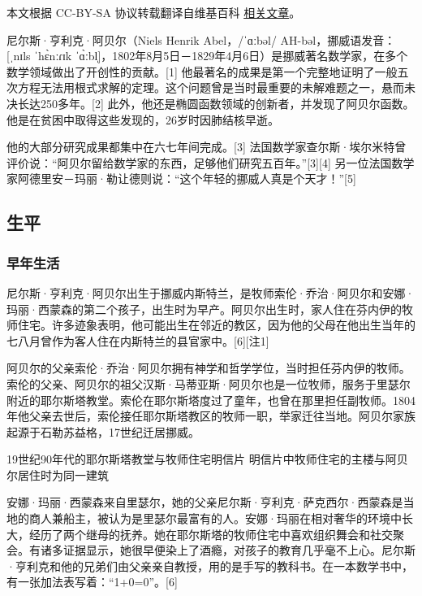 
本文根据 CC-BY-SA 协议转载翻译自维基百科 \href{https://en.wikipedia.org/wiki/Niels_Henrik_Abel}{相关文章}。

尼尔斯·亨利克·阿贝尔（Niels Henrik Abel，/ˈɑːbəl/ AH-bəl，挪威语发音：[ˌnɪls ˈhɛ̀nːɾɪk ˈɑ̀ːbl̩]，1802年8月5日－1829年4月6日）是挪威著名数学家，在多个数学领域做出了开创性的贡献。[1] 他最著名的成果是第一个完整地证明了一般五次方程无法用根式求解的定理。这个问题曾是当时最重要的未解难题之一，悬而未决长达250多年。[2] 此外，他还是椭圆函数领域的创新者，并发现了阿贝尔函数。他是在贫困中取得这些发现的，26岁时因肺结核早逝。

他的大部分研究成果都集中在六七年间完成。[3] 法国数学家查尔斯·埃尔米特曾评价说：“阿贝尔留给数学家的东西，足够他们研究五百年。”[3][4] 另一位法国数学家阿德里安－玛丽·勒让德则说：“这个年轻的挪威人真是个天才！”[5]
\subsection{生平}
\subsubsection{早年生活}
尼尔斯·亨利克·阿贝尔出生于挪威内斯特兰，是牧师索伦·乔治·阿贝尔和安娜·玛丽·西蒙森的第二个孩子，出生时为早产。阿贝尔出生时，家人住在芬内伊的牧师住宅。许多迹象表明，他可能出生在邻近的教区，因为他的父母在他出生当年的七八月曾作为客人住在内斯特兰的县官家中。[6][注1]

阿贝尔的父亲索伦·乔治·阿贝尔拥有神学和哲学学位，当时担任芬内伊的牧师。索伦的父亲、阿贝尔的祖父汉斯·马蒂亚斯·阿贝尔也是一位牧师，服务于里瑟尔附近的耶尔斯塔教堂。索伦在耶尔斯塔度过了童年，也曾在那里担任副牧师。1804年他父亲去世后，索伦接任耶尔斯塔教区的牧师一职，举家迁往当地。阿贝尔家族起源于石勒苏益格，17世纪迁居挪威。

19世纪90年代的耶尔斯塔教堂与牧师住宅明信片
明信片中牧师住宅的主楼与阿贝尔居住时为同一建筑

安娜·玛丽·西蒙森来自里瑟尔，她的父亲尼尔斯·亨利克·萨克西尔·西蒙森是当地的商人兼船主，被认为是里瑟尔最富有的人。安娜·玛丽在相对奢华的环境中长大，经历了两个继母的抚养。她在耶尔斯塔的牧师住宅中喜欢组织舞会和社交聚会。有诸多证据显示，她很早便染上了酒瘾，对孩子的教育几乎毫不上心。尼尔斯·亨利克和他的兄弟们由父亲亲自教授，用的是手写的教科书。在一本数学书中，有一张加法表写着：“1+0=0”。[6]
